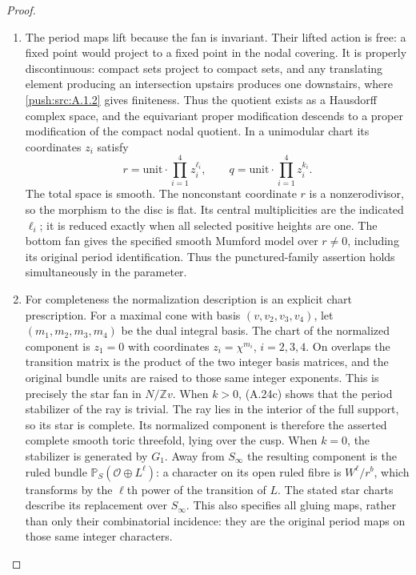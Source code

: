 \begin{proof}
\begin{enumerate}[label=\arabic*.,leftmargin=*]
\item The period maps lift because the fan is invariant. Their
lifted action is free: a fixed point would project to a fixed
point in the nodal covering. It is properly discontinuous:
compact sets project to compact sets, and any translating
element producing an intersection upstairs produces one
downstairs, where \ref{push:src:A.1.2} gives finiteness. Thus the quotient
exists as a Hausdorff complex space, and the equivariant
proper modification descends to a proper modification of
the compact nodal quotient. In a unimodular chart its
coordinates $z_i$ satisfy
\[
 r=\text{unit}\cdot\prod_{i=1}^4 z_i^{\ell_i},
 \qquad q=\text{unit}\cdot\prod_{i=1}^4 z_i^{k_i}.
 \tag{A.24d}
\]
The total space is smooth. The nonconstant coordinate $r$
is a nonzerodivisor, so the morphism to the disc is flat.
Its central multiplicities are the indicated $\ell_i$;
it is reduced exactly when all selected positive heights
are one. The bottom fan gives the specified smooth
Mumford model over $r\ne0$, including its original period
identification. Thus the punctured-family assertion holds
simultaneously in the parameter.

\item For completeness the normalization description is an
explicit chart prescription. For a maximal cone with basis
$(v,v_2,v_3,v_4)$, let $(m_1,m_2,m_3,m_4)$ be the dual
integral basis. The chart of the normalized component is
$z_1=0$ with coordinates $z_i=\chi^{m_i}$, $i=2,3,4$.
On overlaps the transition matrix is the product of the two
integer basis matrices, and the original bundle units are
raised to those same integer exponents. This is precisely
the star fan in $N/\mathbb Zv$. When $k>0$, (A.24c) shows
that the period stabilizer of the ray is trivial. The ray
lies in the interior of the full support, so its star is
complete. Its normalized component is therefore the
asserted complete smooth toric threefold, lying over the
cusp. When $k=0$, the stabilizer is generated by $G_1$.
Away from $S_\infty$ the resulting component is the ruled
bundle $\mathbb P_S(\mathcal O\oplus L^\ell)$: a character
on its open ruled fibre is $W^\ell/r^b$, which transforms
by the $\ell$th power of the transition of $L$. The stated
star charts describe its replacement over $S_\infty$.
This also specifies all gluing maps, rather than only their
combinatorial incidence: they are the original period maps
on those same integer characters.


\end{enumerate}
\end{proof}
